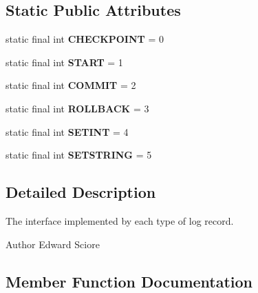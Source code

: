 \subsection*{Static Public Attributes}
\begin{DoxyCompactItemize}
\item 
\mbox{\label{interfacesimpledb_1_1tx_1_1recovery_1_1LogRecord_a33e8b2db2794154d3e4a9ebfe0a7664a}} 
static final int {\bfseries C\+H\+E\+C\+K\+P\+O\+I\+NT} = 0
\item 
\mbox{\label{interfacesimpledb_1_1tx_1_1recovery_1_1LogRecord_ad91bda04a65992441b925311c8247dcb}} 
static final int {\bfseries S\+T\+A\+RT} = 1
\item 
\mbox{\label{interfacesimpledb_1_1tx_1_1recovery_1_1LogRecord_ac6d90cb0075e7d56f599b37e3cc3f673}} 
static final int {\bfseries C\+O\+M\+M\+IT} = 2
\item 
\mbox{\label{interfacesimpledb_1_1tx_1_1recovery_1_1LogRecord_af45dd2e103150fa25d5ad9efef963bc4}} 
static final int {\bfseries R\+O\+L\+L\+B\+A\+CK} = 3
\item 
\mbox{\label{interfacesimpledb_1_1tx_1_1recovery_1_1LogRecord_a20d6d3ec534516217e81540d7ae49b25}} 
static final int {\bfseries S\+E\+T\+I\+NT} = 4
\item 
\mbox{\label{interfacesimpledb_1_1tx_1_1recovery_1_1LogRecord_a48c6f220053a4d1b1c3cf566b9fb538e}} 
static final int {\bfseries S\+E\+T\+S\+T\+R\+I\+NG} = 5
\end{DoxyCompactItemize}


\subsection{Detailed Description}
The interface implemented by each type of log record. \begin{DoxyAuthor}{Author}
Edward Sciore 
\end{DoxyAuthor}


\subsection{Member Function Documentation}
\mbox{\label{interfacesimpledb_1_1tx_1_1recovery_1_1LogRecord_a2c292397e0409fe26f4208aec31776bf}} 
